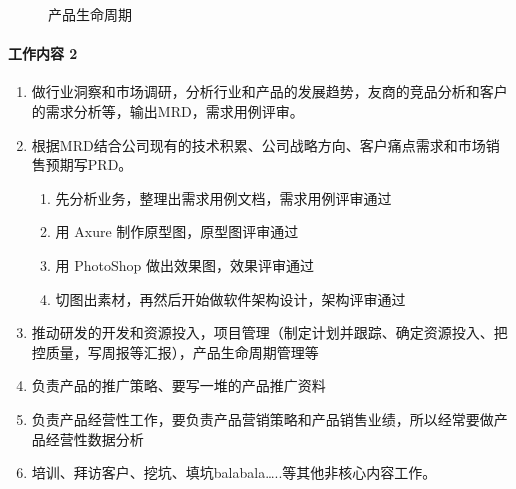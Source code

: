 \documentclass[letterpaper,11pt,english]{sphinxmanual}
\begin{document}
\begin{figure}[H]
\centering
\capstart

\noindent{}
\caption{产品生命周期}\label{\detokenize{chapter_introduction/PM:id31}}\end{figure}


\paragraph{工作内容 2\sphinxfootnotemark[54]}
\label{\detokenize{chapter_introduction/PM:id7}}%
\begin{footnotetext}[54]\sphinxAtStartFootnote
{}
%
\end{footnotetext}\ignorespaces \begin{enumerate}
%
\item {} 
做行业洞察和市场调研，分析行业和产品的发展趋势，友商的竞品分析和客户的需求分析等，输出MRD，需求用例评审。

\item {} 
根据MRD结合公司现有的技术积累、公司战略方向、客户痛点需求和市场销售预期写PRD。
\begin{enumerate}
%
\item {} 
先分析业务，整理出需求用例文档，需求用例评审通过%
\begin{footnote}[55]\sphinxAtStartFootnote
{}
%
\end{footnote}

\item {} 
用 Axure 制作原型图，原型图评审通过

\item {} 
用 PhotoShop 做出效果图，效果评审通过

\item {} 
切图出素材，再然后开始做软件架构设计，架构评审通过

\end{enumerate}

\item {} 
推动研发的开发和资源投入，项目管理（制定计划并跟踪、确定资源投入、把控质量，写周报等汇报），产品生命周期管理等

\item {} 
负责产品的推广策略、要写一堆的产品推广资料

\item {} 
负责产品经营性工作，要负责产品营销策略和产品销售业绩，所以经常要做产品经营性数据分析

\item {} 
培训、拜访客户、挖坑、填坑balabala…..等其他非核心内容工作。

\end{enumerate}
\end{document}

